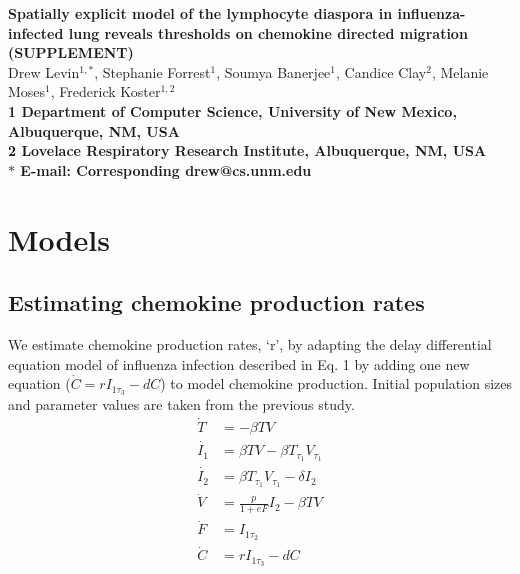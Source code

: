 \documentclass[10pt]{article}
\date{}
\newcommand{\drew}[1]{{\color{dkgreen}#1}}
\begin{document}
\begin{flushleft}
{\Large
\textbf{Spatially explicit model of the lymphocyte diaspora in influenza-infected lung reveals thresholds on chemokine directed migration (SUPPLEMENT)}
}
\\
Drew Levin$^{1,\ast}$, 
Stephanie Forrest$^{1}$, 
Soumya Banerjee$^{1}$,
Candice Clay$^{2}$, 
Melanie Moses$^{1}$, 
Frederick Koster$^{1,2}$
\\
\bf{1} Department of Computer Science, University of New Mexico, Albuquerque, NM, USA
\\
\bf{2} Lovelace Respiratory Research Institute, Albuquerque, NM, USA
\\
$\ast$ E-mail: Corresponding drew@cs.unm.edu
\end{flushleft}


\section{Models}

\subsection{Estimating chemokine production rates}

We estimate chemokine production rates, `r', by adapting the delay differential equation model of influenza infection described in \cite{Mitchell2011} \drew{Eq. 1} by adding one new equation ($\dot{C}=r I_{1 \tau_3}-dC$) to model chemokine production.  Initial population sizes and parameter values are taken from the previous study.
{\footnotesize
\begin{equation}
\begin{aligned}
\dot{T} &= - \beta T V \\
\dot{I_1} &= \beta T V - \beta T_{\tau_1}V_{\tau_1} \\
\dot{I_2} &= \beta T_{\tau_1}V_{\tau_1} - \delta I_2 \\
\dot{V} &= \frac{p}{1+eF} I_2  - \beta T V  \\
\dot{F} &=  I_{1 \tau_2} \\
\dot{C} &= r I_{1 \tau_3} - d C \\
\end{aligned}
\label{eq:dde}
\end{equation}
\vspace{.05in}
}
\end{document}
